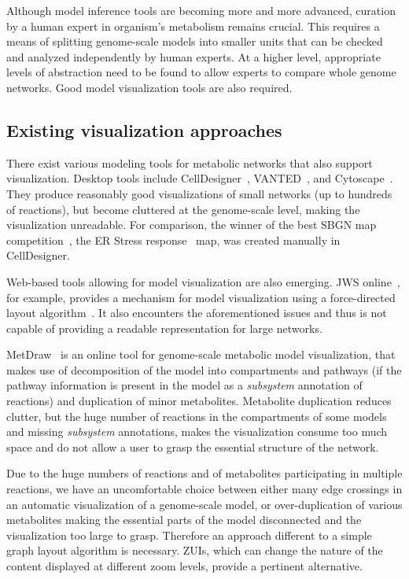 \documentclass{bmcart}
\begin{document}
Although  model inference tools are becoming more and more advanced, curation by a human expert in organism's metabolism remains crucial. This requires a means of splitting genome-scale models into smaller units that can be checked and analyzed independently by human experts. At a higher level, appropriate levels of abstraction need to be found to allow experts to compare whole genome networks. Good model visualization tools are also required.

\subsection*{Existing visualization approaches}
There exist various modeling tools for metabolic networks that also support visualization. Desktop tools include CellDesigner~\cite{Funahashi2008}, VANTED~\cite{Rohn2012}, and Cytoscape~\cite{Smoot2011}. They produce reasonably good visualizations of small networks (up to hundreds of reactions), but become cluttered at the genome-scale level, making the visualization unreadable. For comparison, the winner of the best SBGN map competition~\cite{SBGN}, the ER Stress response~\cite{Groenendyk2010} map,  was created manually in CellDesigner.

Web-based tools allowing for model visualization are also emerging.  JWS online~\cite{Snoep2003}, for example, provides a mechanism for model visualization using a force-directed layout algorithm~\cite{Fruchterman1991, Tamassia:2007:HGD:1202383}. It also encounters the aforementioned issues and thus is not capable of providing a readable representation for large networks.  

MetDraw~\cite{Jensen2014} is an online tool for genome-scale metabolic model visualization, that makes use of decomposition of the model into compartments and pathways (if the pathway information is present in the model as a \emph{subsystem} annotation of reactions) and duplication of minor metabolites. Metabolite duplication reduces clutter, but the huge number of reactions in the compartments of some models and missing \emph{subsystem} annotations, makes the visualization consume too much space and do not allow a user to grasp the essential structure of the network.

Due to the huge numbers of reactions and of metabolites participating in multiple reactions, we have an uncomfortable choice between either many edge crossings in an automatic visualization of a genome-scale model, or over-duplication of various metabolites making the essential parts of the model disconnected and the visualization too large to grasp. Therefore an approach different to a simple graph layout algorithm is necessary. ZUIs, which can change the nature of the content displayed at different zoom levels, provide a pertinent alternative.
\end{document}
